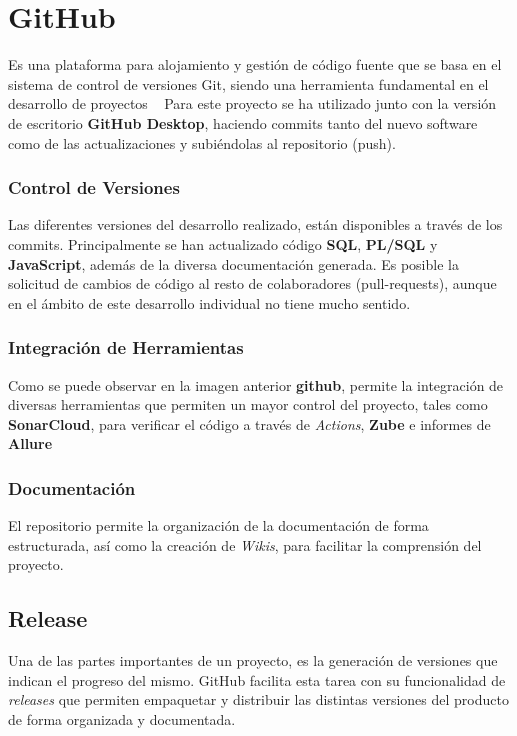 \section{GitHub}
Es una plataforma para alojamiento y gestión de código fuente que se basa en el sistema de control de versiones Git, siendo una herramienta fundamental en el desarrollo de proyectos ~\cite{ChaconProGitTodo}
Para este proyecto se ha utilizado junto con la versión de escritorio \textbf{GitHub Desktop}, haciendo commits tanto del nuevo software como de las actualizaciones y subiéndolas al repositorio (push).
\subsubsection{Control de Versiones}
Las diferentes versiones del desarrollo realizado, están disponibles a través de los commits. Principalmente se han actualizado código \textbf{SQL}, \textbf{PL/SQL} y \textbf{JavaScript}, además de la diversa documentación generada. 
Es posible la solicitud de cambios de código al resto de colaboradores (pull-requests), aunque en el ámbito de este desarrollo individual no tiene mucho sentido.
\subsubsection{Integración de Herramientas}
Como se puede observar en la imagen anterior \textbf{github}, permite la integración de diversas herramientas que permiten un mayor control del proyecto, tales como \textbf{SonarCloud}, para verificar el código a través de \textit{Actions}, \textbf{Zube} e informes de \textbf{Allure}
\subsubsection{Documentación}
El repositorio permite la organización de la documentación de forma estructurada, así como la creación de \textit{Wikis}, para facilitar la comprensión del proyecto.
\subsection{\gls{Release}}
Una de las partes importantes de un proyecto, es la generación de versiones que indican el progreso del mismo. GitHub facilita esta tarea con su funcionalidad de \textit{releases} que permiten empaquetar y distribuir las distintas versiones del producto de forma organizada y documentada.

